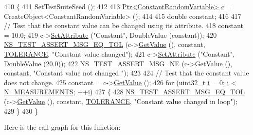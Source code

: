 \begin{DoxyCode}
410 \{
411   SetTestSuiteSeed ();
412 
413   \hyperlink{classns3_1_1Ptr}{Ptr<ConstantRandomVariable>} \hyperlink{lte_2model_2fading-traces_2fading__trace__generator_8m_ae0323a9039add2978bf5b49550572c7c}{c} = CreateObject<ConstantRandomVariable> ();
414 
415   \textcolor{keywordtype}{double} constant;
416 
417   \textcolor{comment}{// Test that the constant value can be changed using its attribute.}
418   constant = 10.0;
419   c->\hyperlink{classns3_1_1ObjectBase_ac60245d3ea4123bbc9b1d391f1f6592f}{SetAttribute} (\textcolor{stringliteral}{"Constant"}, DoubleValue (constant));
420   \hyperlink{group__testing_ga9e7861b56b4e70db3b56044cb7a28e41}{NS\_TEST\_ASSERT\_MSG\_EQ\_TOL} (c->\hyperlink{classns3_1_1ConstantRandomVariable_a4843c136931cb1a9f49838999fc2ebe0}{GetValue} (), constant, 
      \hyperlink{classRandomVariableStreamConstantTestCase_ad76975f181825a0da363ca9e7a2bf2ef}{TOLERANCE}, \textcolor{stringliteral}{"Constant value changed"});
421   c->\hyperlink{classns3_1_1ObjectBase_ac60245d3ea4123bbc9b1d391f1f6592f}{SetAttribute} (\textcolor{stringliteral}{"Constant"}, DoubleValue (20.0));
422   \hyperlink{group__testing_ga73d66fb0050a5111453fd144e767b91a}{NS\_TEST\_ASSERT\_MSG\_NE} (c->\hyperlink{classns3_1_1ConstantRandomVariable_a4843c136931cb1a9f49838999fc2ebe0}{GetValue} (), constant, \textcolor{stringliteral}{"Constant value not changed
      "});
423 
424   \textcolor{comment}{// Test that the constant value does not change.}
425   constant = c->\hyperlink{classns3_1_1ConstantRandomVariable_a4843c136931cb1a9f49838999fc2ebe0}{GetValue} ();
426   \textcolor{keywordflow}{for} (uint32\_t \hyperlink{bernuolliDistribution_8m_a6f6ccfcf58b31cb6412107d9d5281426}{i} = 0; \hyperlink{bernuolliDistribution_8m_a6f6ccfcf58b31cb6412107d9d5281426}{i} < \hyperlink{classRandomVariableStreamConstantTestCase_a0aef4480cc0cfb05d42b5cac17414297}{N\_MEASUREMENTS}; ++\hyperlink{bernuolliDistribution_8m_a6f6ccfcf58b31cb6412107d9d5281426}{i})
427     \{
428       \hyperlink{group__testing_ga9e7861b56b4e70db3b56044cb7a28e41}{NS\_TEST\_ASSERT\_MSG\_EQ\_TOL} (c->\hyperlink{classns3_1_1ConstantRandomVariable_a4843c136931cb1a9f49838999fc2ebe0}{GetValue} (), constant, 
      \hyperlink{classRandomVariableStreamConstantTestCase_ad76975f181825a0da363ca9e7a2bf2ef}{TOLERANCE}, \textcolor{stringliteral}{"Constant value changed in loop"});
429     \}
430 \}
\end{DoxyCode}


Here is the call graph for this function\+:




